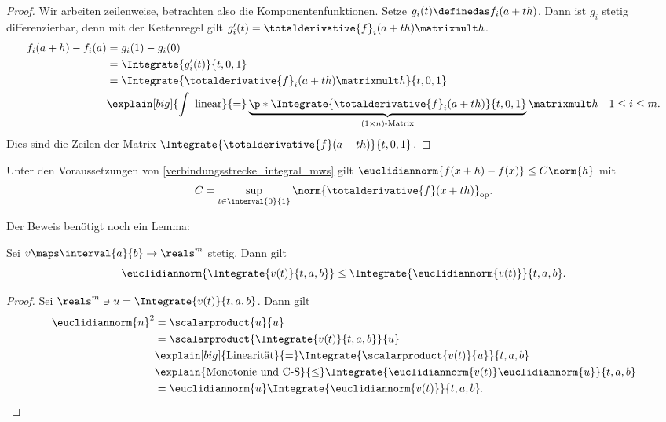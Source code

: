 \begin{proof}
    Wir arbeiten zeilenweise, betrachten also die Komponentenfunktionen. Setze \( g_i(t)\definedas f_i(a+th) \). Dann ist \( g_i \) stetig differenzierbar, denn mit der Kettenregel gilt \( g_i'(t)=\totalderivative{f}_i(a+th)\matrixmult h \).
    \begin{equation*}
        \begin{split}
            f_i(a+h)-f_i(a)&=g_i(1)-g_i(0)\\
            &=\Integrate{g_i'(t)}{t,0,1}\\
            &=\Integrate{\totalderivative{f}_i(a+th)\matrixmult h}{t,0,1}\\
            &\explain[big]{\int \text{ linear}}{=}\underbrace{\p*{ \Integrate{\totalderivative{f}_i(a+th)}{t,0,1} }}_{(1\times n)\text{-Matrix}}\matrixmult h\quad 1\leq i \leq m.
        \end{split}
    \end{equation*}
    Dies sind die Zeilen der Matrix \( \Integrate{\totalderivative{f}(a+th)}{t,0,1} \).
\end{proof}
\begin{folgerung}\label{differenz_abschaetzung_ableitung_verbindungsstrecke}
    Unter den Voraussetzungen von \ref{verbindungsstrecke_integral_mws} gilt \( \euclidiannorm{f(x+h)-f(x)}\leq C\norm{h} \) mit
    \begin{equation*}
        C=\sup_{t\in \interval{0}{1}}\norm{\totalderivative{f}(x+th)}_{\text{op}}.
    \end{equation*}
\end{folgerung}
Der Beweis benötigt noch ein Lemma:
\begin{lemma}\label{integral_norm_dreiecksungleichung}
    Sei \( v\maps \interval{a}{b}\to \reals^m \) stetig. Dann gilt
    \begin{equation*}
        \euclidiannorm{\Integrate{v(t)}{t,a,b}}\leq \Integrate{\euclidiannorm{v(t)}}{t,a,b}.
    \end{equation*}
\end{lemma}
\begin{proof}
    Sei \( \reals^m\ni u=\Integrate{v(t)}{t,a,b} \). Dann gilt
    \begin{equation*}
        \begin{split}
            \euclidiannorm{n}^2&=\scalarproduct{u}{u}\\
            &=\scalarproduct{\Integrate{v(t)}{t,a,b}}{u}\\
            &\explain[big]{\text{Linearität}}{=}\Integrate{\scalarproduct{v(t)}{u}}{t,a,b}\\
            &\explain{\text{Monotonie und C-S}}{\leq}\Integrate{\euclidiannorm{v(t)}\euclidiannorm{u}}{t,a,b}\\
            &=\euclidiannorm{u} \Integrate{\euclidiannorm{v(t)}}{t,a,b}.
        \end{split}
    \end{equation*}
\end{proof}
